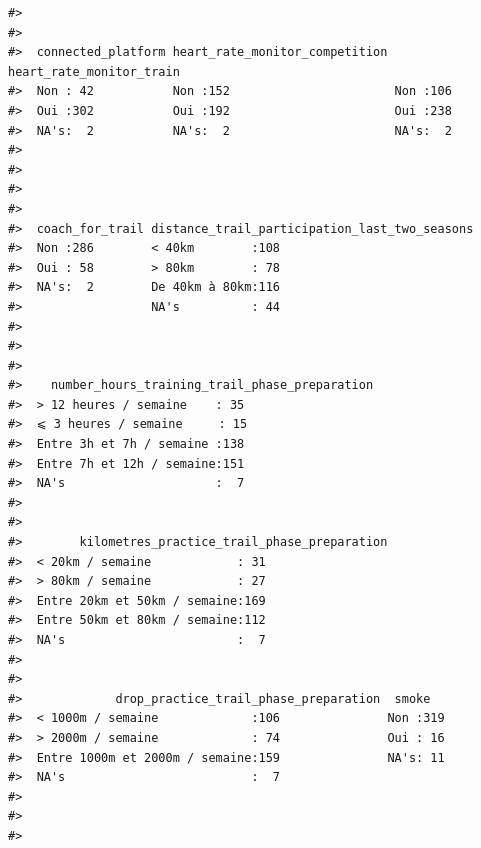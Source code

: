 \documentclass[
]{article}
\begin{document}
\begin{verbatim}
#>                                                                  
#>                                                                  
#>  connected_platform heart_rate_monitor_competition heart_rate_monitor_train
#>  Non : 42           Non :152                       Non :106                
#>  Oui :302           Oui :192                       Oui :238                
#>  NA's:  2           NA's:  2                       NA's:  2                
#>                                                                            
#>                                                                            
#>                                                                            
#>                                                                            
#>  coach_for_trail distance_trail_participation_last_two_seasons
#>  Non :286        < 40km        :108                           
#>  Oui : 58        > 80km        : 78                           
#>  NA's:  2        De 40km à 80km:116                           
#>                  NA's          : 44                           
#>                                                               
#>                                                               
#>                                                               
#>    number_hours_training_trail_phase_preparation
#>  > 12 heures / semaine    : 35                  
#>  ⩽ 3 heures / semaine     : 15                  
#>  Entre 3h et 7h / semaine :138                  
#>  Entre 7h et 12h / semaine:151                  
#>  NA's                     :  7                  
#>                                                 
#>                                                 
#>        kilometres_practice_trail_phase_preparation
#>  < 20km / semaine            : 31                 
#>  > 80km / semaine            : 27                 
#>  Entre 20km et 50km / semaine:169                 
#>  Entre 50km et 80km / semaine:112                 
#>  NA's                        :  7                 
#>                                                   
#>                                                   
#>             drop_practice_trail_phase_preparation  smoke    
#>  < 1000m / semaine             :106               Non :319  
#>  > 2000m / semaine             : 74               Oui : 16  
#>  Entre 1000m et 2000m / semaine:159               NA's: 11  
#>  NA's                          :  7                         
#>                                                             
#>                                                             
#>                                                             

\end{verbatim}
\end{document}
